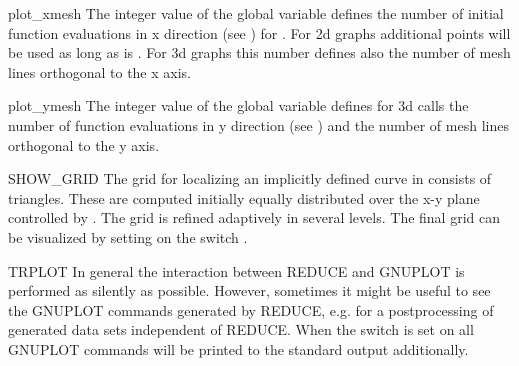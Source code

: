 \begin{Variable}{plot_xmesh}
The integer value of the global variable 
defines the number of initial function evaluations in x
direction (see ) for . For 2d graphs additional
points will be used as long as  is .
For 3d graphs this number defines also the number of mesh lines
orthogonal to the x axis.
\end{Variable}

\begin{Variable}{plot_ymesh}
The integer value of the global variable 
defines for 3d   calls the number of function evaluations in y
direction (see ) and the number of mesh lines
orthogonal to the y axis.
\end{Variable}

\begin{Switch}{SHOW_GRID}
The grid for localizing an implicitly defined curve in 
consists of triangles. These are computed initially equally distributed
over the x-y plane controlled by . The grid is
refined adaptively in several levels. The final grid can be visualized
by setting on the switch .
\end{Switch}


\begin{Switch}{TRPLOT}
In general the interaction between REDUCE and GNUPLOT is performed
as silently as possible. However, sometimes it might be useful
to see the GNUPLOT commands generated by REDUCE, e.g. for a
postprocessing of generated data sets independent of REDUCE.
When the switch  is set on all GNUPLOT commands will
be printed to the standard output additionally.
\end{Switch}
